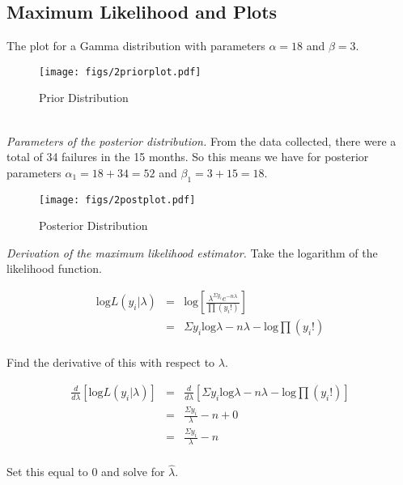\documentclass[12pt]{article}
\begin{document}
\subsection{Maximum Likelihood and Plots}

\noindent The plot for a Gamma distribution with parameters $\alpha=18$ and $\beta=3$.

\begin{figure}[H]
\begin{center}
\texttt{[image: figs/2priorplot.pdf]}
\caption{Prior Distribution}
\end{center}
\end{figure}
\ \\ [2cm]

\noindent \textit{Parameters of the posterior distribution.}  From the data collected, there were a total of 34 failures in the 15 months.  So this means we have for posterior parameters $\alpha_1=18+34=52$ and $\beta_1=3+15=18$.

\begin{figure}[H]
\begin{center}
\texttt{[image: figs/2postplot.pdf]}
\caption{Posterior Distribution}
\end{center}
\end{figure}

\noindent \textit{Derivation of the maximum likelihood estimator.}  Take the logarithm of the likelihood function.

\begin{eqnarray*}
\mathrm{log}L(y_i|\lambda) &=& \mathrm{log}\left[\frac{\lambda^{\Sigma y_i}e^{-n\lambda}}{\prod (y_i!)}\right] \\
&=& \Sigma y_i\mathrm{log}\lambda-n\lambda-\mathrm{log}\prod (y_i!) \\
\end{eqnarray*}

\noindent Find the derivative of this with respect to $\lambda$.

\begin{eqnarray*}
\frac{d}{d\lambda}\left[\mathrm{log}L(y_i|\lambda)\right] &=& \frac{d}{d\lambda}\left[\Sigma y_i\mathrm{log}\lambda-n\lambda-\mathrm{log}\prod (y_i!)\right] \\
&=& \frac{\Sigma y_i}{\lambda}-n+0 \\
&=& \frac{\Sigma y_i}{\lambda}-n \\
\end{eqnarray*}

\noindent Set this equal to 0 and solve for $\hat{\lambda}$.
\end{document}
